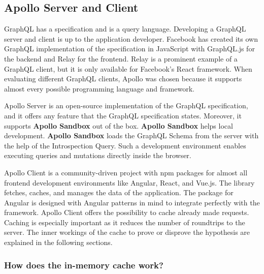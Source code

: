 \subsection{Apollo Server and Client}\label{subsection:background:graphql:apollo-server-client}

GraphQL has a specification and is a query language. Developing a GraphQL server and client is up to the application developer. Facebook has created its own GraphQL implementation of the specification in JavaScript with GraphQL.js for the backend and Relay for the frontend. Relay is a prominent example of a GraphQL client, but it is only available for Facebook's React framework. When evaluating different GraphQL clients, Apollo was chosen because it supports almost every possible programming language and framework.

\bigskip

\noindent Apollo Server is an open-source implementation of the GraphQL specification, and it offers any feature that the GraphQL specification states. Moreover, it supports \textbf{Apollo Sandbox} out of the box. \cite{misc:-:background:graphql:apollo-server-introduction} \textbf{Apollo Sandbox} helps local development. \textbf{Apollo Sandbox} loads the GraphQL Schema from the server with the help of the Introspection Query. \cite{misc:-:background:graphql:apollo-sandbox} Such a development environment enables executing queries and mutations directly inside the browser.

\bigskip

\noindent Apollo Client is a community-driven project with npm packages for almost all frontend development environments like Angular, React, and Vue.js. The library fetches, caches, and manages the data of the application. The package for Angular is designed with Angular patterns in mind to integrate perfectly with the framework. Apollo Client offers the possibility to cache already made requests. \cite{misc:-:background:graphql:apollo-angular-client-overview} \cite{misc:-:background:graphql:apollo-client-overview} Caching is especially important as it reduces the number of roundtrips to the server. The inner workings of the cache to prove or disprove the hypothesis are explained in the following sections.

\subsubsection{How does the in-memory cache work?}\label{subsubsection:background:graphql:apollo-server-client:in-memory-cache-working}


